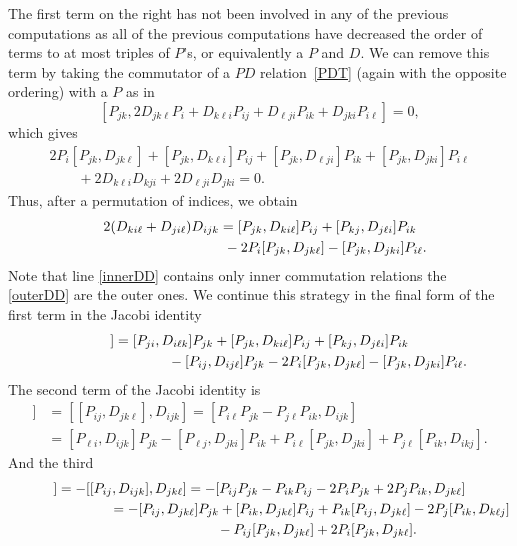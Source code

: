 \documentclass[pdftex]{sigma}
\numberwithin{equation}{section}
\begin{document}
 The first term on the right has not been involved in any of the previous computations as all of the previous computations have decreased the order of terms to at most triples of $P$'s, or equivalently a $P$ and $D$. We can remove this term by taking the commutator of a $PD$ relation~\eqref{PDT} (again with the opposite ordering) with a $P$ as in
 \[
   [P_{jk}, 2D_{jk\ell}P_i + D_{k\ell i}P_{ij}+ D_{ \ell ji}P_{ik}+D_{jki}P_{i\ell}]=0,
 \]
 which gives
 \begin{gather*}
  2P_i [P_{jk}, D_{jk\ell}] + [P_{jk}, D_{ k\ell i} ] P_{ij}+ [P_{jk}, D_{\ell j i}] P_{ik}+ [P_{jk}, D_{jki}]P_{i\ell} \\
  \qquad {}+ 2 D_{k\ell i}D_{kji}+2 D_{\ell j i}D_{jki}=0.
 \end{gather*}
 Thus, after a permutation of indices, we obtain
 \begin{gather}
   2(D_{ki\ell}+D_{ji\ell})D_{ijk} =
   [P_{jk}, D_{ki\ell}]P_{ij}+ [P_{kj}, D_{j\ell i}] P_{ik}\label{outerDD}\\
\hphantom{2(D_{ki\ell}+D_{ji\ell})D_{ijk} =}{} -2P_i [P_{jk},D_{jk\ell}]- [P_{jk}, D_{j k i}] P_{i\ell}.\label{innerDD}
 \end{gather}
 Note that line \eqref{innerDD} contains only inner commutation relations the \eqref{outerDD} are the outer ones. We continue this strategy in the final form of the first term in the Jacobi identity
\begin{gather*}%
 [ P_{i j}, [ D_{ ijk}, D_{jkl}]] =  [P_{ji}, D_{i\ell k}]P_{jk}+[P_{jk}, D_{ki\ell}]P_{ij}+ [P_{kj}, D_{j\ell i}]P_{ik}  \\
\hphantom{[ P_{i j}, [ D_{ ijk}, D_{jkl}]] =}{} - [P_{ij}, D_{ij\ell}] P_{jk}-2P_i [P_{jk},D_{jk\ell}]- [P_{jk}, D_{jk i}]P_{i\ell}.
 \end{gather*}
 The second term of the Jacobi identity is
\begin{align*}
 [ D_{ ijk}, [D_{jk\ell}, P_{i j}]] &=  [[P_{i j},D_{jk\ell} ], D_{ijk}] = [P_{ i \ell}P_{jk}-P_{j\ell}P_{ik}, D_{ijk}]  \\
& =[ P_{\ell i}, D_{i jk}] P_{jk}-[P_{\ell j}, D_{jki}]P_{ik}
 + P_{i \ell}[P_{jk}, D_{jki}]+P_{j\ell} [P_{ik}, D_{ikj}].
 \end{align*}
 And the third
\begin{gather*}
 [ D_{jk\ell}, [P_{i j},D_{ ijk}]] =  -[[P_{i j},D_{ijk} ], D_{jk\ell}]
 = - [P_{ij}P_{jk}-P_{ik}P_{ij} -2P_iP_{jk}+2P_jP_{ik}, D_{jk\ell}]\nonumber\\
\hphantom{[ D_{jk\ell}, [P_{i j},D_{ ijk}]]}{} =  -[P_{ij}, D_{jk\ell}]P_{jk} +[P_{ik}, D_{jk\ell}]P_{ij} + P_{ik}[ P_{ij}, D_{jk\ell}] -2P_j [ P_{ik}, D_{k\ell j}]\nonumber\\
\hphantom{[ D_{jk\ell}, [P_{i j},D_{ ijk}]]=}{}- P_{ij}[P_{jk}, D_{jk\ell}]+2P_i [ P_{jk}, D_{jk\ell}].
 \end{gather*}
\end{document}
